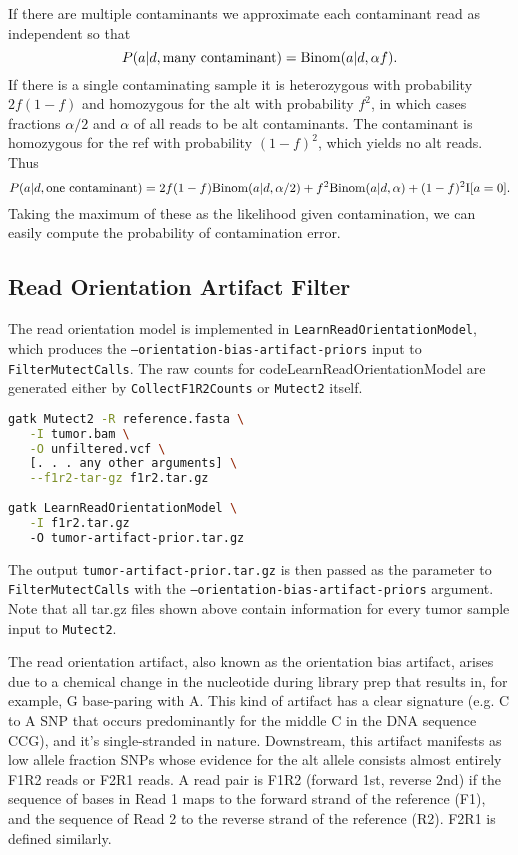 \documentclass[nofootinbib,amssymb,amsmath]{revtex4}
\newcommand{\code}[1]{\texttt{#1}}
\begin{document}
If there are multiple contaminants we approximate each contaminant read as independent so that
\begin{equation}
P(a | d, {\rm many~contaminant}) = {\rm Binom}(a | d, \alpha f).
\end{equation}
If there is a single contaminating sample it is heterozygous with probability $2f(1-f)$ and homozygous for the alt with probability $f^2$, in which cases fractions $\alpha/2$ and $\alpha$ of all reads to be alt contaminants.  The contaminant is homozygous for the ref with probability $(1-f)^2$, which yields no alt reads. Thus
\begin{equation}
P(a | d, {\rm one~contaminant}) = 2f(1-f) {\rm Binom}(a | d, \alpha /2) + f^2 {\rm Binom}(a | d, \alpha) + (1-f)^2 {\rm I}[a = 0].
\end{equation}
Taking the maximum of these as the likelihood given contamination, we can easily compute the probability of contamination error.

\subsection{Read Orientation Artifact Filter}
The read orientation model is implemented in \code{LearnReadOrientationModel}, which produces the  \code{--orientation-bias-artifact-priors} input to \code{FilterMutectCalls}.  The raw counts for code{LearnReadOrientationModel} are generated either by \code{CollectF1R2Counts} or \code{Mutect2} itself.

\begin{lstlisting}[language=bash,caption={LearnReadOrientationModel command}, label={cmd-mutect2}]
gatk Mutect2 -R reference.fasta \
   -I tumor.bam \
   -O unfiltered.vcf \
   [. . . any other arguments] \
   --f1r2-tar-gz f1r2.tar.gz
   
gatk LearnReadOrientationModel \
   -I f1r2.tar.gz
   -O tumor-artifact-prior.tar.gz
\end{lstlisting}
The output \code{tumor-artifact-prior.tar.gz} is then passed as the parameter to \code{FilterMutectCalls} with the \code{--orientation-bias-artifact-priors} argument.  Note that all tar.gz files shown above contain information for every tumor sample input to \code{Mutect2}.

The read orientation artifact, also known as the orientation bias artifact, arises due to a chemical change in the nucleotide during library prep that results in, for example, G base-paring with A. This kind of artifact has a clear signature (e.g. C to A SNP that occurs predominantly for the middle C in the DNA sequence CCG), and it's single-stranded in nature. Downstream, this artifact manifests as low allele fraction SNPs whose evidence for the alt allele consists almost entirely F1R2 reads or F2R1 reads. A read pair is F1R2 (forward 1st, reverse 2nd) if the sequence of bases in Read 1 maps to the forward strand of the reference (F1), and the sequence of Read 2 to the reverse strand of the reference (R2). F2R1 is defined similarly.
\end{document}
